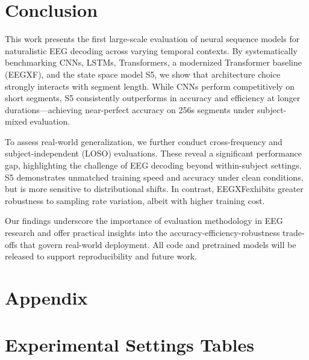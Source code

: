 \documentclass{article}
\newcommand{\eegtrans}{EEGXF}
\begin{document}
\section{Conclusion}
\label{sec:conclusion}


This work presents the first large-scale evaluation of neural sequence models for naturalistic EEG decoding across varying temporal contexts. By systematically benchmarking CNNs, LSTMs, Transformers, a modernized Transformer baseline (\eegtrans), and the state space model S5, we show that architecture choice strongly interacts with segment length. While CNNs perform competitively on short segments, S5 consistently outperforms in accuracy and efficiency at longer durations—achieving near-perfect accuracy on 256s segments under subject-mixed evaluation.

To assess real-world generalization, we further conduct cross-frequency and subject-independent (LOSO) evaluations. These reveal a significant performance gap, highlighting the challenge of EEG decoding beyond within-subject settings. S5 demonstrates unmatched training speed and accuracy under clean conditions, but is more sensitive to distributional shifts. In contrast, \eegtrans exhibits greater robustness to sampling rate variation, albeit with higher training cost.

Our findings underscore the importance of evaluation methodology in EEG research and offer practical insights into the accuracy-efficiency-robustness trade-offs that govern real-world deployment. All code and pretrained models will be released to support reproducibility and future work.

\clearpage
\section*{Appendix}

\appendix

\section{Experimental Settings Tables}
\label{sec:appendix_settings}
\end{document}
